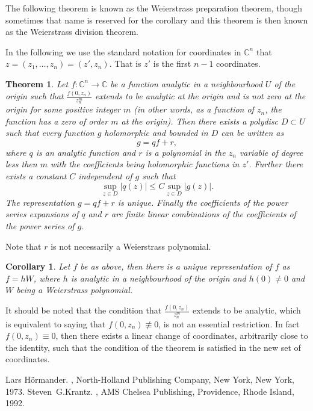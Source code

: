 \documentclass[12pt]{article}
\theoremstyle{theorem}
\newtheorem*{thm}{Theorem}
\newtheorem*{cor}{Corollary}
\theoremstyle{definition}
\theoremstyle{remark}
\begin{document}
The following theorem is known as the Weierstrass preparation theorem, though sometimes that name is reserved for the corollary and this theorem is then known as the Weierstrass division theorem.

In the following we use the standard notation for coordinates in ${\mathbb{C}}^n$ that $z = (z_1,\ldots,z_n) = (z',z_n)$.  That is $z'$ is the first $n-1$ coordinates.

\begin{thm}
Let $f\colon {\mathbb{C}}^n \to {\mathbb{C}}$ be a function analytic in a neighbourhood $U$ of the origin such that
$\frac{f(0,z_n)}{z_n^m}$ extends to be analytic at the origin and is not zero
at the origin for some positive integer $m$ (in other words, as a function of $z_n$, the function has a zero of order $m$ at the origin).  Then there exists
a polydisc $D \subset U$ such that every function $g$ holomorphic and bounded in $D$ can be written as
\begin{equation*}
g =  qf + r ,
\end{equation*}
where $q$ is an analytic function and $r$ is a polynomial in the $z_n$ variable
of degree less then $m$ with the coefficients being holomorphic functions in $z'$.  Further there exists a constant $C$ independent of $g$ such that
\begin{equation*}
\sup_{z \in D} \lvert q(z) \rvert \leq C \sup_{z \in D} \lvert g(z) \rvert .
\end{equation*}
The representation $g = qf +r$ is unique.
Finally the coefficients of the power series expansions of $q$ and $r$ are
finite linear combinations of the coefficients of the power series of $g$.
\end{thm}

Note that $r$ is not necessarily a Weierstrass polynomial.

\begin{cor}
Let $f$ be as above, then there is a unique representation of $f$ as
$f = h W$, where $h$ is analytic in a neighbourhood of the origin and $h(0) \not= 0$ and $W$ being a Weierstrass polynomial.
\end{cor}

It should be noted that the condition that $\frac{f(0,z_n)}{z_n^m}$ extends to be analytic, which is equivalent to
saying that $f(0,z_n) \not\equiv 0$, is not an essential restriction.
In fact $f(0,z_n) \equiv 0$, then there exists a linear change of coordinates, arbitrarily close to the identity, 
such that the condition of the theorem is satisfied in the new set of coordinates.

\begin{thebibliography}{9}
Lars H\"ormander.
{\em {}},
North-Holland Publishing Company, New York, New York, 1973.
Steven~G.\@ Krantz.
{\em {}},
AMS Chelsea Publishing, Providence, Rhode Island, 1992.
\end{thebibliography}
\end{document}
